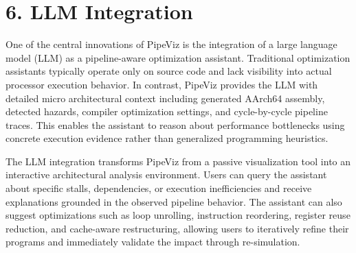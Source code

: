 \section*{6. LLM Integration}





One of the central innovations of PipeViz is the integration of a large language model (LLM) as a pipeline-aware optimization assistant. Traditional optimization assistants typically operate only on source code and lack visibility into actual processor execution behavior. In contrast, PipeViz provides the LLM with detailed micro architectural context including generated AArch64 assembly, detected hazards, compiler optimization settings, and cycle-by-cycle pipeline traces. This enables the assistant to reason about performance bottlenecks using concrete execution evidence rather than generalized programming heuristics.

The LLM integration transforms PipeViz from a passive visualization tool into an interactive architectural analysis environment. Users can query the assistant about specific stalls, dependencies, or execution inefficiencies and receive explanations grounded in the observed pipeline behavior. The assistant can also suggest optimizations such as loop unrolling, instruction reordering, register reuse reduction, and cache-aware restructuring, allowing users to iteratively refine their programs and immediately validate the impact through re-simulation.

